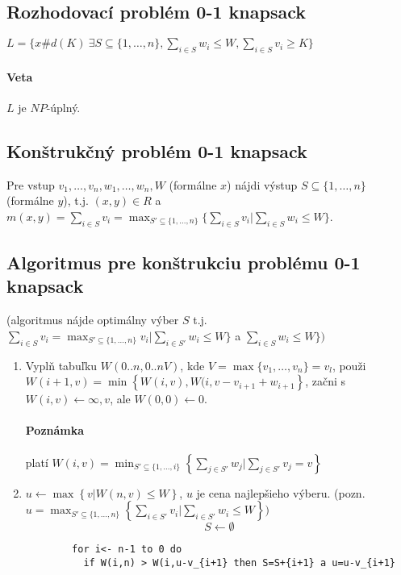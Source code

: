 \documentclass{article}
\begin{document}
\subsection{Rozhodovací problém 0-1 knapsack} $L=\{x\#d(K) \ \exists S
\subseteq\{1,\ldots, n\}, \sum_{i\in S} w_i \leq W, \sum_{i\in S} v_i \geq K\}$
\paragraph{Veta} $L$ je $NP$-úplný.

\subsection{Konštrukčný problém 0-1 knapsack}
Pre vstup $v_1,\ldots, v_n, w_1, \ldots, w_n, W$ (formálne $x$) nájdi výstup $S
\subseteq\{ 1, \ldots, n\}$ (formálne $y$), t.j. $(x,y) \in R$ a $m(x,y) =
\sum_{i\in S} v_i = \max_{S' \subseteq \{1, \ldots, n\}} \{\sum_{i\in S} v_i |
\sum_{i\in S} w_i \leq W\}$.

\subsection{Algoritmus pre konštrukciu problému 0-1 knapsack}
(algoritmus nájde optimálny výber $S$ t.j. $\sum_{i\in S} v_i =
\max_{S'\subseteq\{1,\ldots,n\}} v_i | \sum_{i\in S'} w_i \leq W\}$ a $\sum_{i\in
S} w_i \leq W\})$

\begin{enumerate}
	\item Vyplň tabuľku $W(0..n, 0..nV)$, kde $V = \max\{v_1,\ldots, v_n\} =
	v_l$, použi $W(i+1,v)=\min \left\{W(i,v), W(i,v-v_{i+1}+w_{i+1}\right\}$, začni  s
	$W(i,v) \leftarrow \infty, v$, ale $W(0,0) \leftarrow 0$.
	\paragraph{Poznámka} platí $W(i,v) = \min_{S' \subseteq \{1,\ldots, i\}}
	\left\{ \sum_{j\in S'} w_j | \sum_{j\in S'} v_j = v\right\}$

	\item $ u \leftarrow \max \left\{v|W(n,v) \leq W \right\}$, $u$ je cena
	najlepšieho výberu. (pozn. $u = \max_{S' \subseteq \{1, \ldots, n\}} \left\{ \sum_{i \in S'} v_i |
	\sum_{i \in S'} w_i \leq  W\right\})$
	$$S \leftarrow \emptyset$$
	\begin{verbatim}
		for i<- n-1 to 0 do
		  if W(i,n) > W(i,u-v_{i+1} then S=S+{i+1} a u=u-v_{i+1}
	\end{verbatim}
\end{enumerate}
\end{document}
